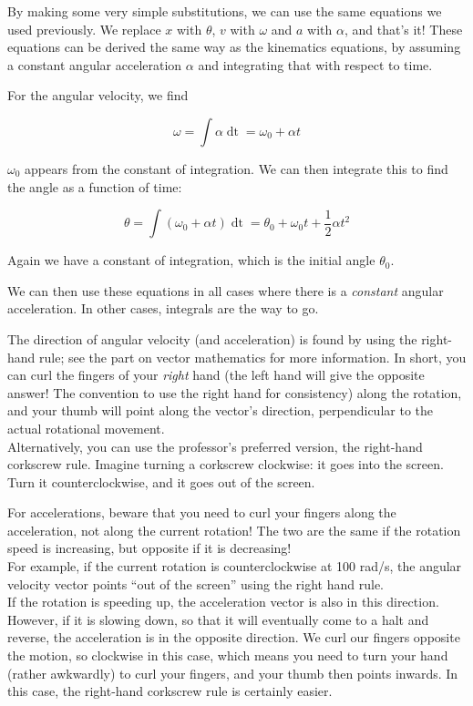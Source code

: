 \documentclass[8.01x]{subfiles}
\begin{document}
By making some very simple substitutions, we can use the same equations we used previously. We replace $x$ with $\theta$, $v$ with $\omega$ and $a$ with $\alpha$, and that's it! These equations can be derived the same way as the kinematics equations, by assuming a constant angular acceleration $\alpha$ and integrating that with respect to time.

For the angular velocity, we find

\begin{equation}
\omega = \int \alpha \mathop{dt} = \omega_0 + \alpha t
\end{equation}

$\omega_0$ appears from the constant of integration. We can then integrate this to find the angle as a function of time:

\begin{equation}
\theta = \int (\omega_0 + \alpha t) \mathop{dt} = \theta_0 + \omega_0 t + \frac{1}{2} \alpha t^2
\end{equation}

Again we have a constant of integration, which is the initial angle $\theta_0$.

We can then use these equations in all cases where there is a \emph{constant} angular acceleration. In other cases, integrals are the way to go.

The direction of angular velocity (and acceleration) is found by using the right-hand rule; see the part on vector mathematics for more information. In short, you can curl the fingers of your \emph{right} hand (the left hand will give the opposite answer! The convention to use the right hand for consistency) along the rotation, and your thumb will point along the vector's direction, perpendicular to the actual rotational movement.\\
Alternatively, you can use the professor's preferred version, the right-hand corkscrew rule. Imagine turning a corkscrew clockwise: it goes into the screen. Turn it counterclockwise, and it goes out of the screen.

For accelerations, beware that you need to curl your fingers along the acceleration, not along the current rotation! The two are the same if the rotation speed is increasing, but opposite if it is decreasing!\\
For example, if the current rotation is counterclockwise at 100 rad/s, the angular velocity vector points ``out of the screen'' using the right hand rule.\\
If the rotation is speeding up, the acceleration vector is also in this direction.\\
However, if it is slowing down, so that it will eventually come to a halt and reverse, the acceleration is in the opposite direction. We curl our fingers opposite the motion, so clockwise in this case, which means you need to turn your hand (rather awkwardly) to curl your fingers, and your thumb then points inwards. In this case, the right-hand corkscrew rule is certainly easier.
\end{document}

